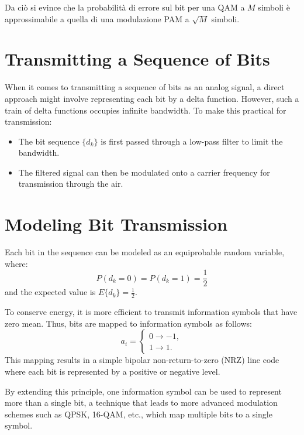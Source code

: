 Da ciò si evince che la probabilità di errore sul bit per una QAM a $M$ simboli è approssimabile a quella di una modulazione PAM a $\sqrt{M}$ simboli.




\section*{Transmitting a Sequence of Bits}

When it comes to transmitting a sequence of bits as an analog signal, a direct approach might involve representing each bit by a delta function. However, such a train of delta functions occupies infinite bandwidth. To make this practical for transmission:

\begin{itemize}
    \item The bit sequence \( \{d_k\} \) is first passed through a low-pass filter to limit the bandwidth.
    \item The filtered signal can then be modulated onto a carrier frequency for transmission through the air.
\end{itemize}

\section*{Modeling Bit Transmission}

Each bit in the sequence can be modeled as an equiprobable random variable, where:
\[
P(d_k = 0) = P(d_k = 1) = \frac{1}{2}
\]
and the expected value is \( E\{d_k\} = \frac{1}{2} \).

To conserve energy, it is more efficient to transmit information symbols that have zero mean. Thus, bits are mapped to information symbols as follows:
\[
a_i =
\begin{cases}
  0 \rightarrow -1,\\
  1 \rightarrow 1.
\end{cases}
\]
This mapping results in a simple bipolar non-return-to-zero (NRZ) line code where each bit is represented by a positive or negative level.

By extending this principle, one information symbol can be used to represent more than a single bit, a technique that leads to more advanced modulation schemes such as QPSK, 16-QAM, etc., which map multiple bits to a single symbol.

